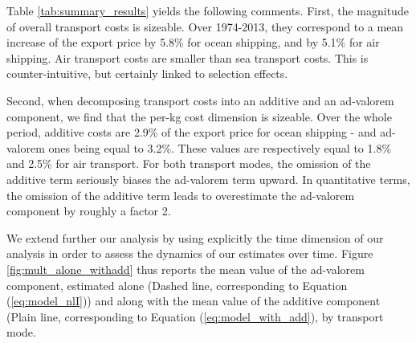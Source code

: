 \documentclass[a4paper,11pt]{article}
\begin{document}
Table \ref{tab:summary_results} yields the following comments. First, the magnitude of overall transport costs is sizeable. Over 1974-2013, they correspond to a mean increase of the export price by 5.8\% for ocean shipping, and by 5.1\% for air shipping. Air transport costs are smaller than sea transport costs. This is counter-intuitive, but certainly linked to selection effects.


Second, when decomposing transport costs into an additive and an ad-valorem component, we find that the per-kg cost dimension is sizeable. Over the whole period, additive costs are 2.9\% of the export price for ocean shipping  - and ad-valorem ones being equal to 3.2\%. These values are respectively equal to 1.8\% and 2.5\% for air transport. For both transport modes, the omission of the additive term seriously biases the ad-valorem term upward. In quantitative terms, the omission of the additive term leads to overestimate the ad-valorem component by roughly a factor 2.

We extend further our analysis by using explicitly the time dimension of our analysis in order to assess the dynamics of our estimates over time. Figure \ref{fig:mult_alone_withadd} thus reports the mean value of the ad-valorem component, estimated alone (Dashed line, corresponding to Equation (\ref{eq:model_nlI})) and along with the mean value of the additive component (Plain line, corresponding to Equation (\ref{eq:model_with_add}), by transport mode.
\end{document}
